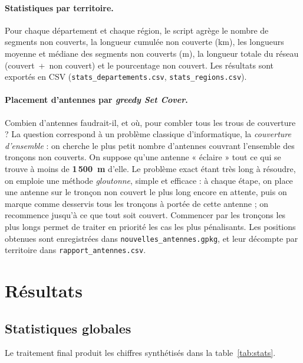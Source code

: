 \documentclass[11pt,a4paper]{article}
\begin{document}
\paragraph{Statistiques par territoire.}
Pour chaque département et chaque région, le script agrège le nombre de segments non couverts, la longueur cumulée non couverte (km), les longueurs moyenne et médiane des segments non couverts (m), la longueur totale du réseau (couvert~+~non couvert) et le pourcentage non couvert. Les résultats sont exportés en CSV (\texttt{stats\_departements.csv}, \texttt{stats\_regions.csv}).

\paragraph{Placement d'antennes par \emph{greedy Set Cover}.}
Combien d'antennes faudrait-il, et où, pour combler tous les trous de couverture ? La question correspond à un problème classique d'informatique, la \emph{couverture d'ensemble} : on cherche le plus petit nombre d'antennes couvrant l'ensemble des tronçons non couverts. On suppose qu'une antenne « éclaire » tout ce qui se trouve à moins de \textbf{1\,500~m} d'elle. Le problème exact étant très long à résoudre, on emploie une méthode \emph{gloutonne}, simple et efficace : à chaque étape, on place une antenne sur le tronçon non couvert le plus long encore en attente, puis on marque comme desservis tous les tronçons à portée de cette antenne ; on recommence jusqu'à ce que tout soit couvert. Commencer par les tronçons les plus longs permet de traiter en priorité les cas les plus pénalisants. Les positions obtenues sont enregistrées dans \texttt{nouvelles\_antennes.gpkg}, et leur décompte par territoire dans \texttt{rapport\_antennes.csv}.

\section{Résultats}

\subsection{Statistiques globales}

Le traitement final produit les chiffres synthétisés dans la table~\ref{tab:stats}.
\end{document}
